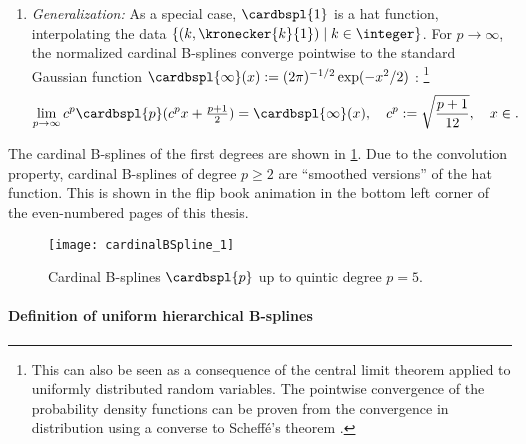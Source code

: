 \begin{enumerate}
  \item
  \emph{Generalization:}
  As a special case, $\cardbspl{1}$ is a hat function,
  interpolating the data
  $\{(k, \kronecker{k}{1}) \mid k \in \integer\}$.
  For $p \to \infty$, the normalized cardinal B-splines converge
  pointwise to the standard Gaussian function
  $\cardbspl{\infty}(x) := (2\pi)^{-1/2} \exp(-x^2/2)$ \cite{Unser92Asymptotic}:%
  \footnote{%
    This can also be seen as a consequence of the central limit theorem
    applied to uniformly distributed random variables.
    The pointwise convergence of the probability density functions
    can be proven from the convergence
    in distribution using a converse to Scheffé's theorem
    \cite{Boos85Converse}.%
  }
  \vspace{-0.5em}
  \begin{equation}
    \lim_{p \to \infty}
    c^p \cardbspl{p}(c^p x + \tfrac{p+1}{2})
    = \cardbspl{\infty}(x),\quad
    c^p := \sqrt{\frac{p+1}{12}},\quad
    x \in \real.
  \end{equation}
\end{enumerate}

The cardinal B-splines of the first degrees are shown in
\cref{fig:cardinalBSpline}.
Due to the convolution property,
cardinal B-splines of degree $p \ge 2$ are ``smoothed versions''
of the hat function.
This is shown in the flip book animation in the bottom left corner
of the even-numbered pages of this thesis.

\begin{figure}
  \texttt{[image: cardinalBSpline\_1]}%
  \caption[%
    Cardinal B-splines%
  ]{%
    Cardinal B-splines $\cardbspl{p}$ up to quintic degree $p = 5$.%
  }%
  \label{fig:cardinalBSpline}%
\end{figure}

\paragraph{Definition of uniform hierarchical B-splines}

